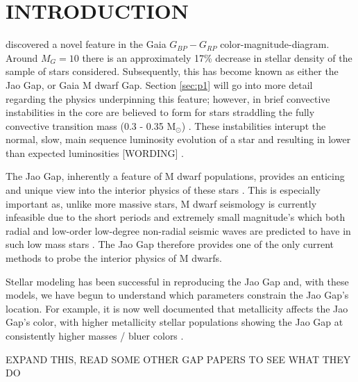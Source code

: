 \section{INTRODUCTION}\label{sec:intro}
\citet{Jao2018} discovered a novel feature in the Gaia $G_{BP}-G_{RP}$
color-magnitude-diagram. Around $M_{G}=10$ there is an approximately 17\%
decrease in stellar density of the sample of stars \citeauthor{Jao2018}
considered. Subsequently, this has become known as either the Jao Gap, or Gaia
M dwarf Gap. Section \ref{sec:p1} will go into more detail regarding the
physics underpinning this feature; however, in brief convective instabilities
in the core are believed to form for stars straddling the fully convective
transition mass (0.3 - 0.35 M$_{\odot}$) \citep{Baraffe2018}. These
instabilities interupt the normal, slow, main sequence luminosity evolution of
a star and resulting in lower than expected luminosities {\color{red} [WORDING]} \citep{Jao2020}.

The Jao Gap, inherently a feature of M dwarf populations, provides an enticing
and unique view into the interior physics of these stars \citep{Feiden2021}.
This is especially important as, unlike more massive stars, M dwarf seismology
is currently infeasible due to the short periods and extremely small
magnitude's which both radial and low-order low-degree non-radial seismic waves
are predicted to have in such low mass stars \citep{Rodriguez-Lopez2019}. The
Jao Gap therefore provides one of the only current methods to probe the
interior physics of M dwarfs.

Stellar modeling has been successful in reproducing the Jao Gap
\citep[e.g.][]{Feiden2021,Mansfield2021} and, with these models, we have begun
to understand which parameters constrain the Jao Gap's location. For example,
it is now well documented that metallicity affects the Jao Gap's color, with
higher metallicity stellar populations showing the Jao Gap at consistently
higher masses / bluer colors \citep{Mansfield2021}.

{\color{red} EXPAND THIS, READ SOME OTHER GAP PAPERS TO SEE WHAT THEY DO}

